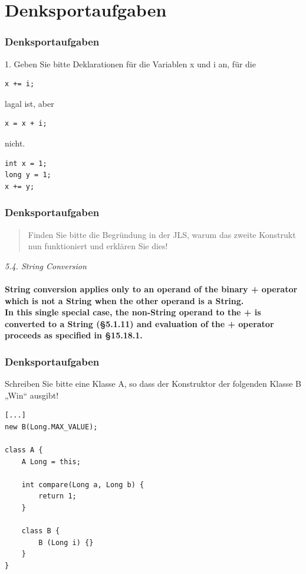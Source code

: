 \documentclass{beamer}
\begin{document}
\section{Denksportaufgaben}
\begin{frame}[fragile]
\frametitle{Denksportaufgaben}

1. Geben Sie bitte Deklarationen für die Variablen x und i an, für die

\begin{lstlisting}
x += i;
\end{lstlisting}

lagal ist, aber

\begin{lstlisting}
x = x + i;
\end{lstlisting}

nicht. \\
\begin{lstlisting}
int x = 1;
long y = 1;
x += y;
\end{lstlisting}

\end{frame}

\begin{frame}
\frametitle{Denksportaufgaben}

\begin{quote}
Finden Sie bitte die Begründung in der JLS, warum das zweite Konstrukt nun funktioniert
und erklären Sie dies!
\end{quote}

\textit{5.4. String Conversion}\\

\textbf{
\\
String conversion applies only to an operand of the binary + operator which is not a String when the other operand is a String.\\
In this single special case, the non-String operand to the + is converted to a String (§5.1.11) and evaluation of the + operator proceeds as specified in §15.18.1.
}


\end{frame}

\begin{frame}[fragile]
\frametitle{Denksportaufgaben}

Schreiben Sie bitte eine Klasse A, so dass der Konstruktor der folgenden Klasse B
„Win“ ausgibt!

\begin{lstlisting}
[...]
new B(Long.MAX_VALUE);

class A {
    A Long = this;

    int compare(Long a, Long b) {
        return 1;
    }

    class B {
        B (Long i) {}
    }
}
\end{lstlisting}

\end{frame}
\end{document}
